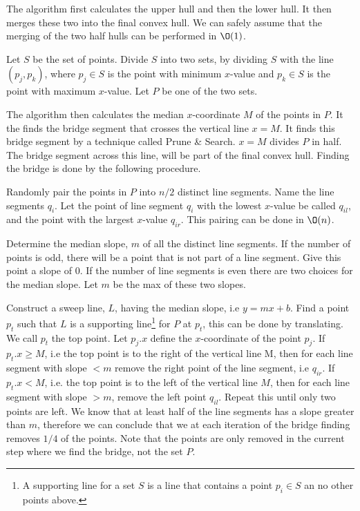 \documentclass[10pt]{article}
\begin{document}
The algorithm first calculates the upper hull and then the lower hull. It then merges these two into the final convex hull. We can safely assume that the merging of the two half hulls can be performed in $\O(1)$.

Let $S$ be the set of points. Divide $S$ into two sets, by dividing $S$ with the line $(p_j,p_k)$, where $p_j \in S$ is the point with minimum $x$-value and $p_k \in S$ is the point with maximum $x$-value. Let $P$ be one of the two sets.

The algorithm then calculates the median $x$-coordinate $M$ of the points in $P$. It the finds the bridge segment that crosses the vertical line $x=M$. It finds this bridge segment by a technique called Prune \& Search. $x=M$ divides $P$ in half. The bridge segment across this line, will be part of the final convex hull. Finding the bridge is done by the following procedure.

Randomly pair the points in $P$ into $n/2$ distinct line segments. Name the line segments $q_i$. Let the point of line segment $q_i$ with the lowest $x$-value be called $q_{il}$, and the point with the largest $x$-value $q_{ir}$. This pairing can be done in $\O(n)$.

Determine the median slope, $m$ of all the distinct line segments. If the number of points is odd, there will be a point that is not part of a line segment. Give this point a slope of $0$. If the number of line segments is even there are two choices for the median slope. Let $m$ be the max of these two slopes.

Construct a sweep line, $L$, having the median slope, i.e $y = mx+b$. Find a point $p_t$ such that $L$ is a supporting line\footnote{A supporting line for a set $S$ is a line that contains a point $p_i \in S$ an no other points above.} for $P$ at $p_t$, this can be done by translating. We call $p_t$ the top point. Let $p_j.x$ define the $x$-coordinate of the point $p_j$. If $p_t.x \geq M$, i.e the top point is to the right of the vertical line M, then for each line segment with slope $< m$ remove the right point of the line segment, i.e $q_{ir}$. If $p_t.x < M$, i.e. the top point is to the left of the vertical line $M$, then for each line segment with slope $>m$, remove the left point $q_{il}$. Repeat this until only two points are left. We know that at least half of the line segments has a slope greater than $m$, therefore we can conclude that we at each iteration of the bridge finding removes $1/4$ of the points. Note that the points are only removed in the current step where we find the bridge, not the set $P$.
\end{document}
